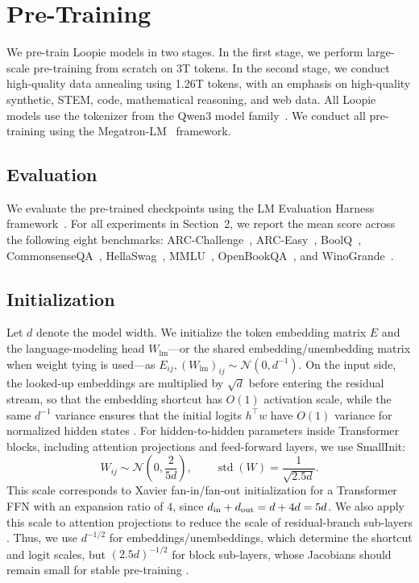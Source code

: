 \section{Pre-Training}
\label{sec:pre-training}

We pre-train Loopie models in two stages. In the first stage, we perform large-scale pre-training from scratch on 3T tokens. In the second stage, we conduct high-quality data annealing using 1.26T tokens, with an emphasis on high-quality synthetic, STEM, code, mathematical reasoning, and web data. All Loopie models use the tokenizer from the Qwen3 model family~\citep{qwen3}. We conduct all pre-training using the Megatron-LM~\citep{megatron-lm} framework.

\subsection{Evaluation}
\label{sec:pre-training_eval}

We evaluate the pre-trained checkpoints using the LM Evaluation Harness framework~\citep{eval-harness}. For all experiments in Section~2, we report the mean score across the following eight benchmarks: ARC-Challenge~\citep{clark2018think}, ARC-Easy~\citep{clark2018think}, BoolQ~\citep{clark2019boolq}, CommonsenseQA~\citep{talmor2019commonsenseqa}, HellaSwag~\citep{zellers2019hellaswag}, MMLU~\citep{hendrycks2021measuring}, OpenBookQA~\citep{mihaylov2018openbookqa}, and WinoGrande~\citep{sakaguchi2020winogrande}.

\subsection{Initialization}
Let \(d\) denote the model width. We initialize the token embedding
matrix \(E\) and the language-modeling head \(W_{\mathrm{lm}}\)---or
the shared embedding/unembedding matrix when weight tying is used---as
\(E_{ij},(W_{\mathrm{lm}})_{ij}\sim\mathcal{N}(0,d^{-1})\). On the
input side, the looked-up embeddings are multiplied by \(\sqrt d\)
before entering the residual stream, so that the embedding shortcut has
\(O(1)\) activation scale, while the same \(d^{-1}\) variance ensures that
the initial logits \(h^\top w\) have \(O(1)\) variance for normalized hidden
states \citep{shazeer2018adafactor,takase2025spike}.
For hidden-to-hidden parameters inside Transformer blocks, including
attention projections and feed-forward layers, we use SmallInit:
\[
    W_{ij}\sim \mathcal{N}\!\left(0,\frac{2}{5d}\right),
    \qquad \operatorname{std}(W)=\frac{1}{\sqrt{2.5d}}.
\]
This scale corresponds to Xavier fan-in/fan-out initialization for a
Transformer FFN with an expansion ratio of \(4\), since \(d_{\rm in}+d_{\rm out}
=d+4d=5d\). We also apply this scale to attention projections to reduce the
scale of residual-branch sub-layers
\citep{glorot2010understanding,nguyen2019transformers}. Thus, we use
\(d^{-1/2}\) for embeddings/unembeddings, which determine the shortcut
and logit scales, but \((2.5d)^{-1/2}\) for block sub-layers, whose
Jacobians should remain small for stable pre-training
\citep{takase2025spike}.

